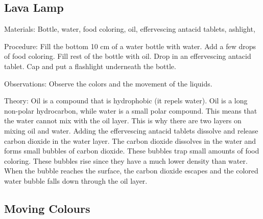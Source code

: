 \begin{multicols}{2}
\subsection{Lava Lamp} %


\begin{description*}
\item[Materials:]{Bottle, water, food coloring, oil, effervescing
antacid tablets, 
ashlight,}
\item[Procedure:]{Fill the bottom 10 cm of a water bottle with water. Add
a few drops of food coloring. Fill rest of the bottle with oil. Drop in
an effervescing antacid tablet. Cap and put a 
flashlight underneath the
bottle. }
\item[Observations:]{Observe the colors and the movement of the liquids.}
\item[Theory:]{Oil is a compound that is hydrophobic (it repels
water). Oil is a long non-polar hydrocarbon, while water
is a small polar compound. This means that the water cannot mix with
the oil layer. This is why there are two layers on mixing oil and water.
Adding the effervescing antacid tablets dissolve and release carbon dioxide
in the water layer. The carbon dioxide dissolves in the water and forms
small bubbles of carbon dioxide. These bubbles trap small amounts of
food coloring. These bubbles rise since they have a much lower density
than water. When the bubble reaches the surface, the carbon dioxide
escapes and the colored water bubble falls down through the oil layer.}
\end{description*}

\columnbreak

\subsection{Moving Colours} %



\end{multicols}
